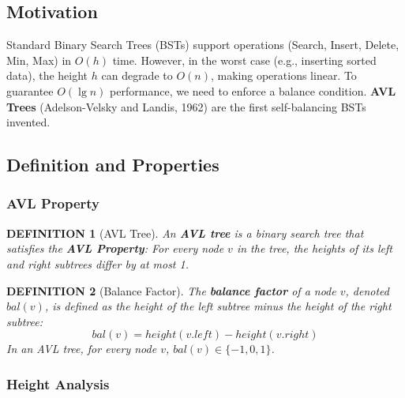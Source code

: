 \documentclass[12pt]{article}
\theoremstyle{blueplain}
\theoremstyle{bluedef}
\newtheorem{definition}{DEFINITION}[section]
\theoremstyle{blueremark}
\begin{document}
\subsection{Motivation}

Standard Binary Search Trees (BSTs) support operations (Search, Insert, Delete, Min, Max) in $O(h)$ time. However, in the worst case (e.g., inserting sorted data), the height $h$ can degrade to $O(n)$, making operations linear.
To guarantee $O(\lg n)$ performance, we need to enforce a balance condition. \textbf{AVL Trees} (Adelson-Velsky and Landis, 1962) are the first self-balancing BSTs invented.

\subsection{Definition and Properties}

\subsubsection{AVL Property}

\begin{definition}[AVL Tree]
    An \textbf{AVL tree} is a binary search tree that satisfies the \textbf{AVL Property}:
    For every node $v$ in the tree, the heights of its left and right subtrees differ by at most 1.
\end{definition}

\begin{definition}[Balance Factor]
    The \textbf{balance factor} of a node $v$, denoted $bal(v)$, is defined as the height of the left subtree minus the height of the right subtree:
    \[ bal(v) = height(v.left) - height(v.right) \]
    In an AVL tree, for every node $v$, $bal(v) \in \{-1, 0, 1\}$.
\end{definition}

\subsubsection{Height Analysis}
\end{document}
